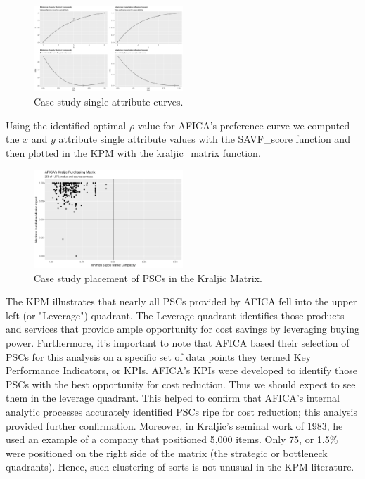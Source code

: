 \documentclass[twocolumn]{svjour3}       %
\begin{document}
\begin{figure}[!htb]
  \includegraphics[width=0.5\textwidth]{fig6.png}
  \caption{Case study single attribute curves.}
  \label{fig:6}
\end{figure}

Using the identified optimal $\rho$ value for AFICA's preference curve we computed the $x$ and $y$ attribute single attribute values with the SAVF\_score function and then plotted in the KPM with the kraljic\_matrix function.

\begin{figure}[!htb]
  \includegraphics[width=0.5\textwidth]{fig7.png}
  \caption{Case study placement of PSCs in the Kraljic Matrix.}
  \label{fig:7}
\end{figure}

The KPM illustrates that nearly all PSCs provided by AFICA fell into the upper left (or "Leverage") quadrant.  The Leverage quadrant identifies those products and services that provide ample opportunity for cost savings by leveraging buying power.  Furthermore, it's important to note that AFICA based their selection of PSCs for this analysis on a specific set of data points they termed Key Performance Indicators, or KPIs. AFICA's KPIs were developed to identify those PSCs with the best opportunity for cost reduction. Thus we should expect to see them in the leverage quadrant. This helped to confirm that AFICA's internal analytic processes accurately identified PSCs ripe for cost reduction; this analysis provided further confirmation. Moreover, in Kraljic's seminal work of 1983, he used an example of a company that positioned 5,000 items. Only 75, or 1.5\% were positioned on the right side of the matrix (the strategic or bottleneck quadrants). Hence, such clustering of sorts is not unusual in the KPM literature. 
\end{document}
